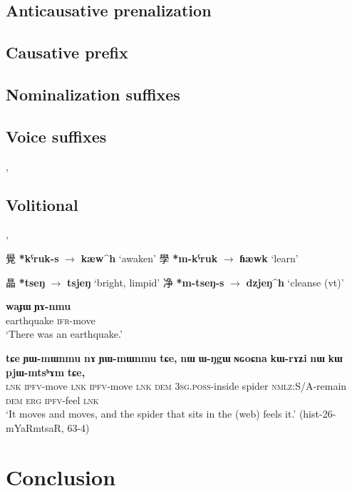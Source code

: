 \documentclass[oneside,a4paper,11pt]{article}
\newcommand{\ipa}[1]{\textbf{{\phon\mbox{#1}}}} %
\newcommand{\zh}[1]{{\cn #1}}
\begin{document}
\subsection{Anticausative prenalization}
\citet{sagart03prenasalized}
\citet{jacques15spontaneous, jacques15causative}

\subsection{Causative prefix}
\citet{sagart12sprefix}
\citet{jacques15causative}

\subsection{Nominalization suffixes}
\citet{jacques16ssuffixes}

\subsection{Voice suffixes}
\citet{jacques16ssuffixes}, \citet{jacques16si}


\subsection{Volitional}
\citet[55]{bs14oc}, \citet{jacques16japhug}

\zh{覺} \ipa{*kˁruk-s} $\rightarrow$ \ipa{kæw^h} `awaken'
\zh{學} \ipa{*m-kˁruk} $\rightarrow$ \ipa{ɦæwk} `learn'

\zh{晶} \ipa{*tseŋ} $\rightarrow$ \ipa{tsjeŋ} `bright, limpid'
\zh{净} \ipa{*m-tseŋ-s} $\rightarrow$ \ipa{dzjeŋ^h} `cleanse (vt)'

\begin{exe}
\ex 
\gll
\ipa{waɟɯ} \ipa{ɲɤ-nmu} \\
earthquake \textsc{ifr}-move \\
\glt `There was an earthquake.'
\end{exe}

\begin{exe}
\ex 
\gll
\ipa{tɕe}	\ipa{ɲɯ-mɯnmu}	\ipa{nɤ}	\ipa{ɲɯ-mɯnmu}	\ipa{tɕe,}	\ipa{nɯ}	\ipa{ɯ-ŋgɯ}	\ipa{ɴɢoɕna}	\ipa{kɯ-rɤʑi}	\ipa{nɯ}	\ipa{kɯ}	\ipa{pjɯ-mtsʰɤm}	\ipa{tɕe,} \\
\textsc{lnk} \textsc{ipfv}-move \textsc{lnk}  \textsc{ipfv}-move \textsc{lnk} \textsc{dem} \textsc{3sg.poss}-inside spider \textsc{nmlz}:S/A-remain \textsc{dem} \textsc{erg} \textsc{ipfv}-feel \textsc{lnk} \\
\glt `It moves and moves, and the spider that sits in the (web) feels it.' (hist-26-mYaRmtsaR, 63-4)
\end{exe}
\section*{Conclusion}



\end{document}
